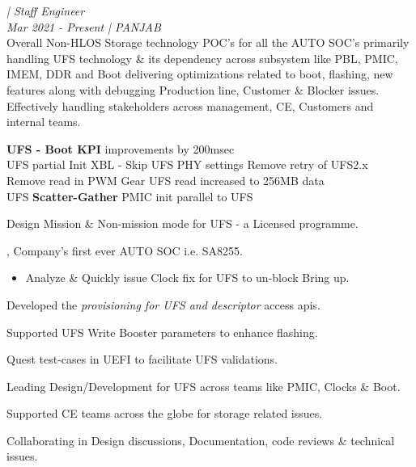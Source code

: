 {\large{\textit{\textbf{\CompanyA} | Staff Engineer}}}\\
{\small{\textit{Mar 2021 - Present | PANJAB}}} \\
\scriptsize{Overall Non-HLOS Storage technology POC's for all the AUTO SOC's primarily handling UFS technology \& its dependency across subsystem like PBL, PMIC, IMEM, DDR and Boot \textendash{} delivering optimizations related to boot, flashing, new features along with debugging Production line, Customer \& Blocker issues. \\
Effectively handling stakeholders across management, CE, Customers and internal teams.%
}
\begin{itemize}
\footnotesize {
   \item \noindent \textbf{UFS - Boot KPI} improvements \textemdash{} by 200msec \\
      \textbullet UFS partial Init               \textbullet XBL - Skip UFS PHY settings    \textbullet Remove retry of UFS2.x \\
      \textbullet Remove read in PWM Gear        \textbullet UFS read increased to 256MB data   \\
      \textbullet UFS \textbf{Scatter-Gather}    \textbullet PMIC init parallel to UFS
      \item \noindent Design Mission \& Non-mission mode for UFS - a Licensed programme.
      \item {}, Company's first ever AUTO SOC i.e. SA8255.
%
      \begin{itemize}
      \item \noindent Analyze \& Quickly issue Clock fix for UFS to un-block Bring up.
      \end{itemize}
%
      \item \noindent Developed the \textit{provisioning for UFS and descriptor} access apis.
      \item \noindent Supported UFS Write Booster parameters to enhance flashing.
      \item \noindent Quest test-cases in UEFI to facilitate UFS validations.
      \item \noindent Leading Design/Development for UFS across teams like PMIC, Clocks \& Boot.
      \item \noindent Supported CE teams across the globe for storage related issues.
      \item \noindent Collaborating in Design discussions, Documentation, code reviews \& technical issues.
}
\end{itemize}


